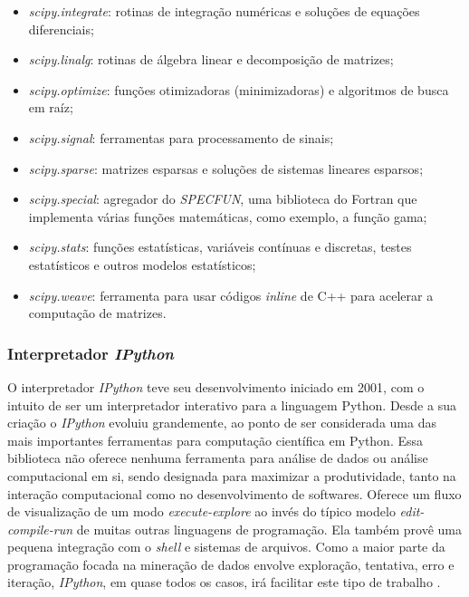 \begin{itemize}
	\item \textit{scipy.integrate}: rotinas de integração numéricas e soluções de equações diferenciais;
	\item \textit{scipy.linalg}: rotinas de álgebra linear e decomposição de matrizes;
	\item \textit{scipy.optimize}: funções otimizadoras (minimizadoras) e algoritmos de busca em raíz;
	\item \textit{scipy.signal}: ferramentas para processamento de sinais;
	\item \textit{scipy.sparse}: matrizes esparsas e soluções de sistemas lineares esparsos;
	\item \textit{scipy.special}: agregador do \textit{SPECFUN}, uma biblioteca do Fortran que implementa várias funções matemáticas, como exemplo, a função gama;
	\item \textit{scipy.stats}: funções estatísticas, variáveis contínuas e discretas, testes estatísticos e outros modelos estatísticos;
	\item \textit{scipy.weave}: ferramenta para usar códigos \textit{inline} de C++ para acelerar a computação de matrizes.
\end{itemize}


\subsubsection{Interpretador \textit{IPython}}
O interpretador \textit{IPython} teve seu desenvolvimento iniciado em 2001, com o intuito de ser um interpretador interativo para a linguagem Python. Desde a sua criação o \textit{IPython} evoluiu grandemente, ao ponto de ser considerada uma das mais importantes ferramentas para computação científica em Python. Essa biblioteca não oferece nenhuma ferramenta para análise de dados ou análise computacional em si, sendo designada para maximizar a produtividade, tanto na interação computacional como no desenvolvimento de softwares. Oferece um fluxo de visualização de um modo \textit{execute-explore} ao invés do típico modelo \textit{edit-compile-run} de muitas outras linguagens de programação. Ela também provê uma pequena integração com o \textit{shell} e sistemas de arquivos. Como a maior parte da programação focada na mineração de dados envolve exploração, tentativa, erro e iteração, \textit{IPython}, em quase todos os casos, irá facilitar este tipo de trabalho \cite{python-analysis}.

